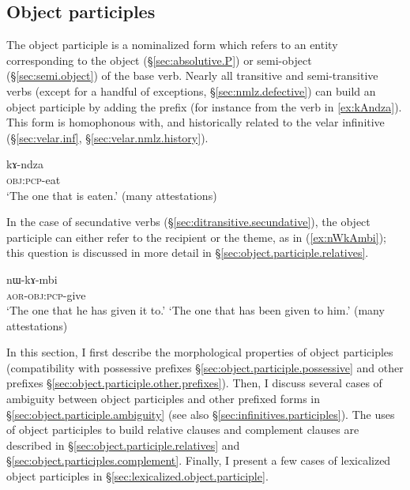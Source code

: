 \subsection{Object participles} \label{sec:object.participle}
The object participle is a nominalized form which refers to an entity corresponding to the object (§\ref{sec:absolutive.P}) or semi-object (§\ref{sec:semi.object}) of the base verb. Nearly all transitive and semi-transitive verbs (except for a handful of exceptions, §\ref{sec:nmlz.defective}) can build an object participle by adding the prefix  (for instance  from the verb  in \ref{ex:kAndza}). This form is homophonous with, and historically related to the velar infinitive (§\ref{sec:velar.inf}, §\ref{sec:velar.nmlz.history}).

 \begin{exe} 
\ex \label{ex:kAndza}
\gll kɤ-ndza \\
   \textsc{obj}:\textsc{pcp}-eat \\
 \glt  `The one that is eaten.' (many attestations)
 \end{exe}

In the case of secundative verbs (§\ref{sec:ditransitive.secundative}), the object participle can either refer to the recipient or the theme, as in (\ref{ex:nWkAmbi}); this question is discussed in more detail in §\ref{sec:object.participle.relatives}.

  \begin{exe} 
\ex \label{ex:nWkAmbi}
\gll nɯ-kɤ-mbi \\
   \textsc{aor}-\textsc{obj}:\textsc{pcp}-give \\
 \glt  `The one that he has given it to.'
 \glt `The one that has been given to him.'  (many attestations)
 \end{exe}

   
 In this section, I first describe the morphological properties of object participles (compatibility with possessive prefixes §\ref{sec:object.participle.possessive} and other prefixes §\ref{sec:object.participle.other.prefixes}). Then, I discuss several cases of ambiguity between object participles and other  prefixed forms in §\ref{sec:object.participle.ambiguity} (see also §\ref{sec:infinitives.participles}). The uses of object participles to build relative clauses and complement clauses are described in  §\ref{sec:object.participle.relatives} and §\ref{sec:object.participles.complement}. Finally, I present a few cases of lexicalized object participles in §\ref{sec:lexicalized.object.participle}.
 

